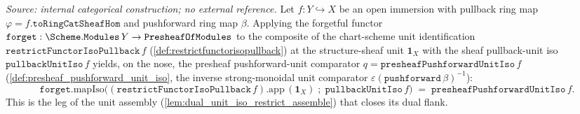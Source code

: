 \begin{lemma}\leanok
  \label{lem:forget_unit_restrict_eq_pushforward_unit}
  \textit{Source: internal categorical construction; no external reference.}
  Let \(f : Y \hookrightarrow X\) be an open immersion with pullback ring map
  \(\varphi = f.\mathtt{toRingCatSheafHom}\) and pushforward ring map \(\beta\). Applying the
  forgetful functor \(\mathtt{forget} : \Scheme.\mathtt{Modules}\,Y \to \mathtt{PresheafOfModules}\)
  to the composite of the chart-scheme unit identification
  \(\mathtt{restrictFunctorIsoPullback}\,f\) (\cref{def:restrictfunctorisopullback}) at the
  structure-sheaf unit \(\mathbf 1_X\) with the sheaf pullback-unit iso \(\mathtt{pullbackUnitIso}\,f\)
  yields, on the nose, the presheaf pushforward-unit comparator
  \(q = \mathtt{presheafPushforwardUnitIso}\,f\) (\cref{def:presheaf_pushforward_unit_iso}, the inverse
  strong-monoidal unit comparator \(\varepsilon(\mathtt{pushforward}\,\beta)^{-1}\)):
  \[
    \mathtt{forget}.\mathrm{mapIso}\bigl(
      (\mathtt{restrictFunctorIsoPullback}\,f).\mathrm{app}\,(\mathbf 1_X)
        \;\mathbin{;}\; \mathtt{pullbackUnitIso}\,f\bigr)
      \;=\; \mathtt{presheafPushforwardUnitIso}\,f .
  \]
  This is the leg of the unit assembly (\cref{lem:dual_unit_iso_restrict_assemble}) that closes its
  dual flank.
\end{lemma}
